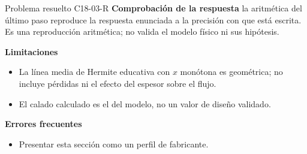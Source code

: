 \documentclass[10pt,openany]{book}
\begin{document}
\begin{studiumworked}{Problema resuelto C18-03-R}
\noindent\textbf{Comprobación de la respuesta} la aritmética del último paso reproduce la respuesta enunciada a la precisión con que está escrita. Es una reproducción aritmética; no valida el modelo físico ni sus hipótesis.

\noindent\textbf{Limitaciones}
\begin{itemize}
\item La línea media de Hermite educativa con $x$ monótona es geométrica; no incluye pérdidas ni el efecto del espesor sobre el flujo.
\item El calado calculado es el del modelo, no un valor de diseño validado.
\end{itemize}

\noindent\textbf{Errores frecuentes}
\begin{itemize}
\item Presentar esta sección como un perfil de fabricante.
\end{itemize}
\end{studiumworked}
\end{document}
